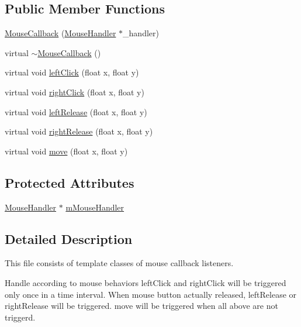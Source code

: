 \subsection*{Public Member Functions}
\begin{DoxyCompactItemize}
\item 
\hyperlink{classMouseCallback_a0c6cd1db4b3bce0802f12256c6d7bf50}{Mouse\+Callback} (\hyperlink{classMouseHandler}{Mouse\+Handler} $\ast$\+\_\+handler)
\item 
virtual \hyperlink{classMouseCallback_a98466ace1354c848bd341b6baf5c92b5}{$\sim$\+Mouse\+Callback} ()
\item 
virtual void \hyperlink{classMouseCallback_a5ae88358471f1b48e3f6a730aaf0ba13}{left\+Click} (float x, float y)
\item 
virtual void \hyperlink{classMouseCallback_aa4a0c30b50b48972d0a48b9aff6344c5}{right\+Click} (float x, float y)
\item 
virtual void \hyperlink{classMouseCallback_a2a57b20538c6c7bf4a590140852bdd24}{left\+Release} (float x, float y)
\item 
virtual void \hyperlink{classMouseCallback_ab308a03d06ee903955875b36e1f31565}{right\+Release} (float x, float y)
\item 
virtual void \hyperlink{classMouseCallback_a9a667f1501597e44af0e0d9f1dfcbd6a}{move} (float x, float y)
\end{DoxyCompactItemize}
\subsection*{Protected Attributes}
\begin{DoxyCompactItemize}
\item 
\hyperlink{classMouseHandler}{Mouse\+Handler} $\ast$ \hyperlink{classMouseCallback_a6977cef81442eaa57f63d1995b31a240}{m\+Mouse\+Handler}
\end{DoxyCompactItemize}


\subsection{Detailed Description}
This file consists of template classes of mouse callback listeners. 

Handle according to mouse behaviors left\+Click and right\+Click will be triggered only once in a time interval. When mouse button actually released, left\+Release or right\+Release will be triggered. move will be triggered when all above are not triggerd. 

